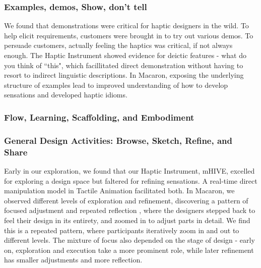 \subsubsection{Examples, demos, Show, don't tell}
We found that demonstrations were critical for haptic designers in the wild.
To help elicit requirements, customers were brought in to try out various demos.
To persuade customers, actually feeling the haptics was critical, if not always enough.
The Haptic Instrument showed evidence for deictic features - what do you think of ``this", which facillitated direct demonstration without having to resort to indirect linguistic descriptions.
In Macaron, exposing the underlying structure of examples lead to improved understanding of how to develop sensations and developed haptic idioms.




\subsubsection{Flow, Learning, Scaffolding, and Embodiment}







\subsubsection{General Design Activities: Browse, Sketch, Refine, and Share}

Early in our exploration, we found that our Haptic Instrument, mHIVE, excelled for exploring a design space but faltered for refining sensations.
A real-time direct manipulation model in Tactile Animation facilitated both.
In Macaron, we observed different levels of exploration and refinement, discovering a pattern of focused adjustment and repeated reflection \cite{Schon1982}, where the designers stepped back to feel their design in its entirety, and zoomed in to adjust parts in detail.
We find this is a repeated pattern, where participants iteratively zoom in and out to different levels.
The mixture of focus also depended on the stage of design - early on, exploration and execution take a more prominent role, while later refinement has smaller adjustments and more reflection.

